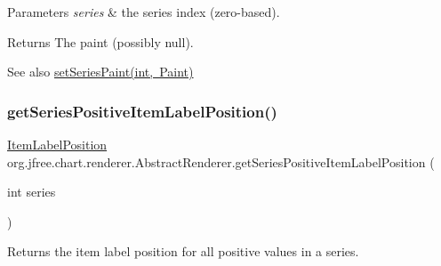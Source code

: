 \begin{DoxyParams}{Parameters}
{\em series} & the series index (zero-\/based).\\
\hline
\end{DoxyParams}
\begin{DoxyReturn}{Returns}
The paint (possibly {\ttfamily null}).
\end{DoxyReturn}
\begin{DoxySeeAlso}{See also}
\mbox{\hyperlink{classorg_1_1jfree_1_1chart_1_1renderer_1_1_abstract_renderer_a65149cab3fbc60f7e6b1b51fbd5a29ed}{set\+Series\+Paint(int, Paint)}} 
\end{DoxySeeAlso}
\mbox{\label{classorg_1_1jfree_1_1chart_1_1renderer_1_1_abstract_renderer_aeeec0341e079d624ac0a0984fbe83ceb}} 
\subsubsection{\texorpdfstring{get\+Series\+Positive\+Item\+Label\+Position()}{getSeriesPositiveItemLabelPosition()}}
{\footnotesize\ttfamily \mbox{\hyperlink{classorg_1_1jfree_1_1chart_1_1labels_1_1_item_label_position}{Item\+Label\+Position}} org.\+jfree.\+chart.\+renderer.\+Abstract\+Renderer.\+get\+Series\+Positive\+Item\+Label\+Position (\begin{DoxyParamCaption}\item[{int}]{series }\end{DoxyParamCaption})}

Returns the item label position for all positive values in a series.


